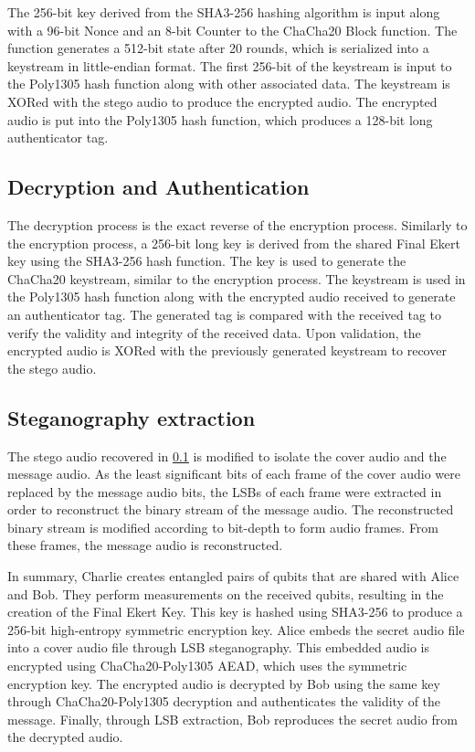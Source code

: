 \documentclass[a4paper]{cas-sc}
\begin{document}
The 256-bit key derived from the SHA3-256 hashing algorithm is input along with a 96-bit Nonce and an 8-bit Counter to the ChaCha20 Block function. The function generates a 512-bit state after 20 rounds, which is serialized into a keystream in little-endian format. The first 256-bit of the keystream is input to the Poly1305 hash function along with other associated data. The keystream is XORed with the stego audio to produce the encrypted audio. The encrypted audio is put into the Poly1305 hash function, which produces a 128-bit long authenticator tag.
\subsection{Decryption and Authentication}
\label{sec:chacha20poly1305decryption}
The decryption process is the exact reverse of the encryption process. Similarly to the encryption process, a 256-bit long key is derived from the shared Final Ekert key using the SHA3-256 hash function. The key is used to generate the ChaCha20 keystream, similar to the encryption process. The keystream is used in the Poly1305 hash function along with the encrypted audio received to generate an authenticator tag. The generated tag is compared with the received tag to verify the validity and integrity of the received data. Upon validation, the encrypted audio is XORed with the previously generated keystream to recover the stego audio.
\subsection{Steganography extraction}
\label{sec:stegoExtract}
The stego audio recovered in \ref{sec:chacha20poly1305decryption} is modified to isolate the cover audio and the message audio. As the least significant bits of each frame of the cover audio were replaced by the message audio bits, the LSBs of each frame were extracted in order to reconstruct the binary stream of the message audio. The reconstructed binary stream is modified according to bit-depth to form audio frames. From these frames, the message audio is reconstructed.

In summary, Charlie creates entangled pairs of qubits that are shared with Alice and Bob. They perform measurements on the received qubits, resulting in the creation of the Final Ekert Key. This key is hashed using SHA3-256 to produce a 256-bit high-entropy symmetric encryption key. Alice embeds the secret audio file into a cover audio file through LSB steganography. This embedded audio is encrypted using ChaCha20-Poly1305 AEAD, which uses the symmetric encryption key. The encrypted audio is decrypted by Bob using the same key through ChaCha20-Poly1305 decryption and authenticates the validity of the message. Finally, through LSB extraction, Bob reproduces the secret audio from the decrypted audio.
\end{document}
